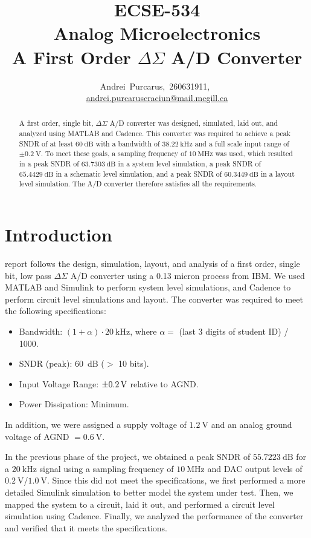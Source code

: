\documentclass[journal,hidelinks]{IEEEtran}
\title{ECSE-534 \\ Analog Microelectronics \\
  A First Order $\Delta \Sigma$ A/D Converter}
\author{Andrei~Purcarus,~260631911,~\IEEEmembership{McGill~University} \\ \href{mailto:andrei.purcaruscraciun@mail.mcgill.ca}{andrei.purcaruscraciun@mail.mcgill.ca}}
\begin{document}
\sloppy

\maketitle

\begin{abstract}

A first order, single bit, $\Delta \Sigma$ A/D converter was designed, simulated, laid out, and analyzed using MATLAB and Cadence. This converter was required to achieve a peak SNDR of at least $\SI{60}{\deci\bel}$ with a bandwidth of $\SI{38.22}{\kilo\hertz}$ and a full scale input range of $\pm \SI{0.2}{\volt}$. To meet these goals, a sampling frequency of $\SI{10}{\mega\hertz}$ was used, which resulted in a peak SNDR of $\SI{63.7303}{\deci\bel}$ in a system level simulation, a peak SNDR of $\SI{65.4429}{\deci\bel}$ in a schematic level simulation, and a peak SNDR of $\SI{60.3449}{\deci\bel}$ in a layout level simulation. The A/D converter therefore satisfies all the requirements.

\end{abstract}

\section{Introduction}

 report follows the design, simulation, layout, and analysis of a first order, single bit, low pass $\Delta \Sigma$ A/D converter using a 0.13 micron process from IBM. We used MATLAB and Simulink to perform system level simulations, and Cadence to perform circuit level simulations and layout. The converter was required to meet the following specifications:
\begin{itemize}
  \item Bandwidth: $(1 + \alpha) \cdot \SI{20}{\kilo\hertz}$, where $\alpha =$ (last 3 digits of student ID) / 1000.
  \item SNDR (peak): \SI{60}{\deci\bel} ($>$ 10 bits).
  \item Input Voltage Range: $\SI{\pm 0.2}{\volt}$ relative to AGND.
  \item Power Dissipation: Minimum.
\end{itemize}
In addition, we were assigned a supply voltage of $\SI{1.2}{\volt}$ and an analog ground voltage of AGND $= \SI{0.6}{\volt}$.

In the previous phase of the project, we obtained a peak SNDR of $\SI{55.7223}{\deci\bel}$ for a $\SI{20}{\kilo\hertz}$ signal using a sampling frequency of $\SI{10}{\mega\hertz}$ and DAC output levels of $\SI{0.2}{\volt}$/$\SI{1.0}{\volt}$. Since this did not meet the specifications, we first performed a more detailed Simulink simulation to better model the system under test. Then, we mapped the system to a circuit, laid it out, and performed a circuit level simulation using Cadence. Finally, we analyzed the performance of the converter and verified that it meets the specifications.
\end{document}
